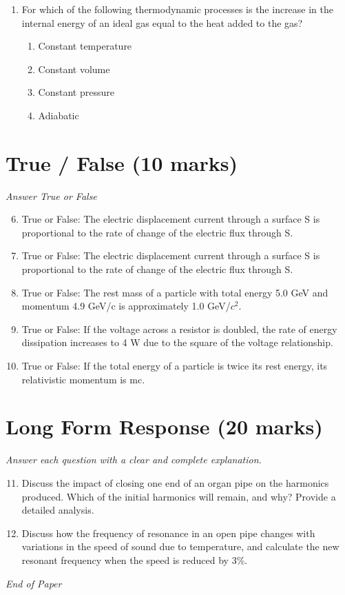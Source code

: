 \documentclass[12pt]{article}
\begin{document}
\begin{enumerate}[label=\arabic*.]
\begin{enumerate}[label=(\alph*)]
    \item P
    \item Sb
    \item B
\end{enumerate}
\item For which of the following thermodynamic processes is the increase in the internal energy of an ideal gas equal to the heat added to the gas?
\begin{enumerate}[label=(\alph*)]
    \item Constant temperature
    \item Constant volume
    \item Constant pressure
    \item Adiabatic
\end{enumerate}
\end{enumerate}

\section*{True / False (10 marks)}
\textit{Answer True or False}
\begin{enumerate}[label=\arabic*.]
\setcounter{enumi}{5}
\item True or False: The electric displacement current through a surface S is proportional to the rate of change of the electric flux through S.
\item True or False: The electric displacement current through a surface S is proportional to the rate of change of the electric flux through S.
\item True or False: The rest mass of a particle with total energy 5.0 GeV and momentum 4.9 GeV/c is approximately 1.0 GeV/$c^2$.
\item True or False: If the voltage across a resistor is doubled, the rate of energy dissipation increases to 4 W due to the square of the voltage relationship.
\item True or False: If the total energy of a particle is twice its rest energy, its relativistic momentum is mc.
\end{enumerate}

\section*{Long Form Response (20 marks)}
\textit{Answer each question with a clear and complete explanation.}
\begin{enumerate}[label=\arabic*.]
\setcounter{enumi}{10}
\item Discuss the impact of closing one end of an organ pipe on the harmonics produced. Which of the initial harmonics will remain, and why? Provide a detailed analysis.
\item Discuss how the frequency of resonance in an open pipe changes with variations in the speed of sound due to temperature, and calculate the new resonant frequency when the speed is reduced by 3\%.
\end{enumerate}

\vfill
\noindent\textit{End of Paper}
\end{document}
